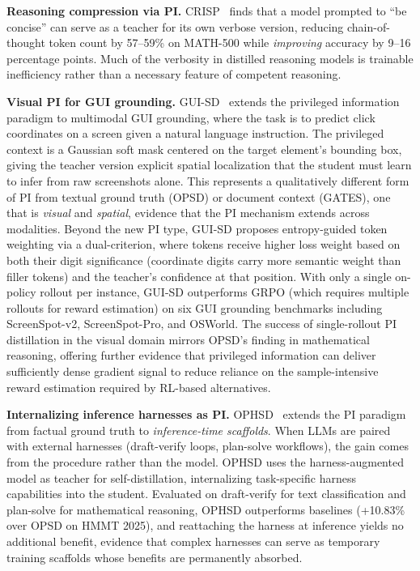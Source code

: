\documentclass{article} %
\begin{document}
\textbf{Reasoning compression via PI.} CRISP~\citep{2603.05433} finds that a model prompted to ``be concise'' can serve as a teacher for its own verbose version, reducing chain-of-thought token count by 57--59\% on MATH-500 while \emph{improving} accuracy by 9--16 percentage points. Much of the verbosity in distilled reasoning models is trainable inefficiency rather than a necessary feature of competent reasoning.

\textbf{Visual PI for GUI grounding.} GUI-SD~\citep{2605.00642} extends the privileged information paradigm to multimodal GUI grounding, where the task is to predict click coordinates on a screen given a natural language instruction. The privileged context is a Gaussian soft mask centered on the target element's bounding box, giving the teacher version explicit spatial localization that the student must learn to infer from raw screenshots alone. This represents a qualitatively different form of PI from textual ground truth (OPSD) or document context (GATES), one that is \emph{visual} and \emph{spatial}, evidence that the PI mechanism extends across modalities. Beyond the new PI type, GUI-SD proposes entropy-guided token weighting via a dual-criterion, where tokens receive higher loss weight based on both their digit significance (coordinate digits carry more semantic weight than filler tokens) and the teacher's confidence at that position. With only a single on-policy rollout per instance, GUI-SD outperforms GRPO (which requires multiple rollouts for reward estimation) on six GUI grounding benchmarks including ScreenSpot-v2, ScreenSpot-Pro, and OSWorld. The success of single-rollout PI distillation in the visual domain mirrors OPSD's finding in mathematical reasoning, offering further evidence that privileged information can deliver sufficiently dense gradient signal to reduce reliance on the sample-intensive reward estimation required by RL-based alternatives.

\textbf{Internalizing inference harnesses as PI.} OPHSD~\citep{2605.08741} extends the PI paradigm from factual ground truth to \emph{inference-time scaffolds}. When LLMs are paired with external harnesses (draft-verify loops, plan-solve workflows), the gain comes from the procedure rather than the model. OPHSD uses the harness-augmented model as teacher for self-distillation, internalizing task-specific harness capabilities into the student. Evaluated on draft-verify for text classification and plan-solve for mathematical reasoning, OPHSD outperforms baselines (+10.83\% over OPSD on HMMT 2025), and reattaching the harness at inference yields no additional benefit, evidence that complex harnesses can serve as temporary training scaffolds whose benefits are permanently absorbed.
\end{document}
